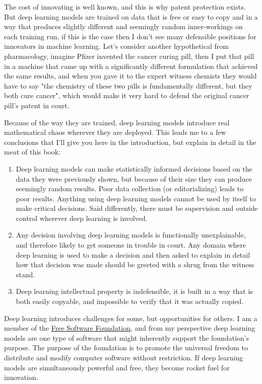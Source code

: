 The cost of innovating is well known, and this is why patent protection exists. But deep learning models are trained on data that is free or easy to copy and in a way that produces slightly different and seemingly random inner-workings on each training run, if this is the case then I don't see many defensible positions for innovators in machine learning. Let's consider another hypothetical from pharmacology, imagine Pfizer invented the cancer curing pill, then I put that pill in a machine that came up with a significantly different formulation that achieved the same results, and when you gave it to the expert witness chemists they would have to say "the chemistry of these two pills is fundamentally different, but they both cure cancer", which would make it very hard to defend the original cancer pill's patent in court.

Because of the way they are trained, deep learning models introduce real mathematical chaos wherever they are deployed. This leads me to a few conclusions that I'll give you here in the introduction, but explain in detail in the meat of this book: 

\begin{enumerate}
\item Deep learning models can make statistically informed decisions based on the data they were previously shown, but because of their size they can produce seemingly random results. Poor data collection (or editorializing) leads to poor results. Anything using deep learning models cannot be used by itself to make critical decisions. Said differently, there must be supervision and outside control wherever deep learning is involved.
\item Any decision involving deep learning models is functionally unexplainable, and therefore likely to get someone in trouble in court. Any domain where deep learning is used to make a decision and then asked to explain in detail how that decision was made should be greeted with a shrug from the witness stand.
\item Deep learning intellectual property is indefensible, it is built in a way that is both easily copyable, and impossible to verify that it was actually copied.
\end{enumerate}

Deep learning introduces challenges for some, but opportunities for others. I am a member of the \href{https://www.fsf.org/}{Free Software Foundation}, and from my perspective deep learning models are one type of software that might inherently support the foundation's purpose. The purpose of the foundation is to promote the universal freedom to distribute and modify computer software without restriction. If deep learning models are simultaneously powerful and free, they become rocket fuel for innovation. 

